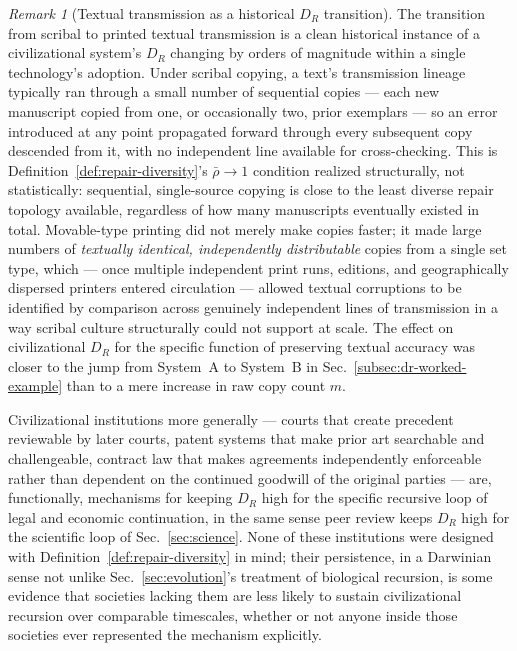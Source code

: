 \documentclass[11pt,a4paper]{article}
\theoremstyle{plain}
\theoremstyle{definition}
\theoremstyle{remark}
\newtheorem{remark}[theorem]{Remark}
\newcommand{\DR}{D_R}
\begin{document}
\begin{remark}[Textual transmission as a historical $\DR$ transition]
\label{rem:printing-press}
The transition from scribal to printed textual transmission is a clean historical instance of a civilizational system's $\DR$ changing by orders of magnitude within a single technology's adoption. Under scribal copying, a text's transmission lineage typically ran through a small number of sequential copies — each new manuscript copied from one, or occasionally two, prior exemplars — so an error introduced at any point propagated forward through every subsequent copy descended from it, with no independent line available for cross-checking. This is Definition~\ref{def:repair-diversity}'s $\bar\rho \to 1$ condition realized structurally, not statistically: sequential, single-source copying is close to the least diverse repair topology available, regardless of how many manuscripts eventually existed in total. Movable-type printing did not merely make copies faster; it made large numbers of \emph{textually identical, independently distributable} copies from a single set type, which — once multiple independent print runs, editions, and geographically dispersed printers entered circulation — allowed textual corruptions to be identified by comparison across genuinely independent lines of transmission in a way scribal culture structurally could not support at scale. The effect on civilizational $\DR$ for the specific function of preserving textual accuracy was closer to the jump from System~A to System~B in Sec.~\ref{subsec:dr-worked-example} than to a mere increase in raw copy count $m$.
\end{remark}

Civilizational institutions more generally — courts that create precedent reviewable by later courts, patent systems that make prior art searchable and challengeable, contract law that makes agreements independently enforceable rather than dependent on the continued goodwill of the original parties — are, functionally, mechanisms for keeping $\DR$ high for the specific recursive loop of legal and economic continuation, in the same sense peer review keeps $\DR$ high for the scientific loop of Sec.~\ref{sec:science}. None of these institutions were designed with Definition~\ref{def:repair-diversity} in mind; their persistence, in a Darwinian sense not unlike Sec.~\ref{sec:evolution}'s treatment of biological recursion, is some evidence that societies lacking them are less likely to sustain civilizational recursion over comparable timescales, whether or not anyone inside those societies ever represented the mechanism explicitly.
\end{document}
